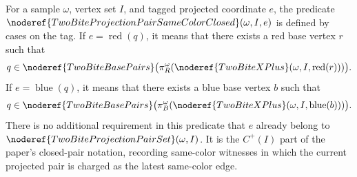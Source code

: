 \begin{definition}
For a sample \(\omega\), vertex set \(I\), and tagged projected coordinate
\(e\), the predicate
\(\noderef{TwoBiteProjectionPairSameColorClosed}(\omega,I,e)\) is defined by
cases on the tag.  If \(e=\operatorname{red}(q)\), it means that there exists a
red base vertex \(r\) such that
\[
q\in
\noderef{TwoBiteBasePairs}
\bigl(\pi_R^\omega(\noderef{TwoBiteXPlus}(\omega,I,\operatorname{red}(r)))\bigr).
\]
If \(e=\operatorname{blue}(q)\), it means that there exists a blue base vertex
\(b\) such that
\[
q\in
\noderef{TwoBiteBasePairs}
\bigl(\pi_B^\omega(\noderef{TwoBiteXPlus}(\omega,I,\operatorname{blue}(b)))\bigr).
\]
There is no additional requirement in this predicate that \(e\) already belong
to \(\noderef{TwoBiteProjectionPairSet}(\omega,I)\).  It is the \(C^+(I)\)
part of the paper's closed-pair notation, recording same-color witnesses in
which the current projected pair is charged as the latest same-color edge.
\end{definition}
